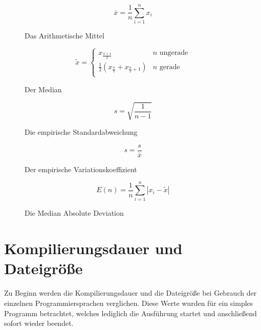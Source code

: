 \begin{figure}
	\caption{Das Arithmetische Mittel}
	\begin{equation}
		\label{formula:mean}
		\bar{x} = \frac{1}{n} \sum_{i=1}^n{x_i}
	\end{equation}
\end{figure}

\begin{figure}
	\caption{Der Median}
	\begin{equation}
		\label{formula:median}
		\tilde{x} =
		\begin{cases}
			x_{\frac{n + 1}{2}} & n \text{ ungerade} \\
			\frac{1}{2}(x_\frac{n}{2} + x_{\frac{n}{2} + 1}) & n \text{ gerade} \\
		\end{cases}
	\end{equation}
\end{figure}

\begin{figure}
	\caption{Die empirische Standardabweichung}
	\begin{equation}
		\label{formula:std_deviation}
		s = \sqrt{\frac{1}{n - 1}}
	\end{equation}
\end{figure}

\begin{figure}
	\caption{Der empirische Variationskoeffizient}
	\begin{equation}
		\label{formula:variation_coefficient}
		s = \frac{s}{\bar{x}}
	\end{equation}
\end{figure}

\begin{figure}
	\caption{Die Median Absolute Deviation}
	\begin{equation}
		\label{formula:mad}
		E(n) = \frac{1}{n} \sum_{i=1}^n{|x_i - \tilde{x}|}
	\end{equation}
\end{figure}




\section{Kompilierungsdauer und Dateigröße}\label{sec:compile_time_filesize}

Zu Beginn werden die Kompilierungsdauer und die Dateigröße bei Gebrauch der einzelnen Programmiersprachen
verglichen. Diese Werte wurden für ein simples Programm betrachtet, welches lediglich die Ausführung startet und
anschließend sofort wieder beendet.

